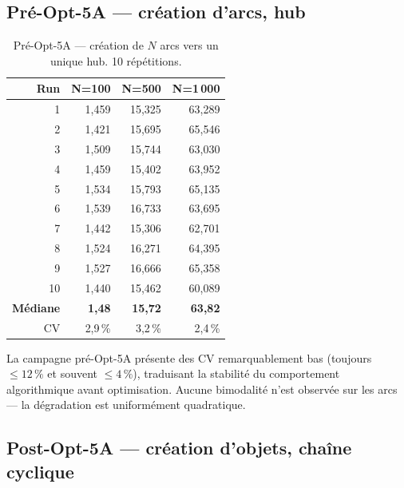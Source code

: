 \subsection*{Pré-Opt-5A --- création d'arcs, hub}

\begin{table}[h]
\centering
\caption{Pré-Opt-5A --- création de $N$ arcs vers un unique hub.
10 répétitions.}
\begin{tabular}{rrrr}
\hline
\textbf{Run} & \textbf{N=100} & \textbf{N=500} & \textbf{N=1\,000} \\
\hline
1  & 1,459 & 15,325 & 63,289 \\
2  & 1,421 & 15,695 & 65,546 \\
3  & 1,509 & 15,744 & 63,030 \\
4  & 1,459 & 15,402 & 63,952 \\
5  & 1,534 & 15,793 & 65,135 \\
6  & 1,539 & 16,733 & 63,695 \\
7  & 1,442 & 15,306 & 62,701 \\
8  & 1,524 & 16,271 & 64,395 \\
9  & 1,527 & 16,666 & 65,358 \\
10 & 1,440 & 15,462 & 60,089 \\
\hline
\textbf{Médiane} & \textbf{1,48} & \textbf{15,72} & \textbf{63,82} \\
CV               & 2,9\,\%       & 3,2\,\%        & 2,4\,\% \\
\hline
\end{tabular}
\end{table}

La campagne pré-Opt-5A présente des CV remarquablement bas (toujours
$\leq 12\,\%$ et souvent $\leq 4\,\%$), traduisant la stabilité du
comportement algorithmique avant optimisation. Aucune bimodalité n'est
observée sur les arcs --- la dégradation est uniformément quadratique.

\subsection*{Post-Opt-5A --- création d'objets, chaîne cyclique}

